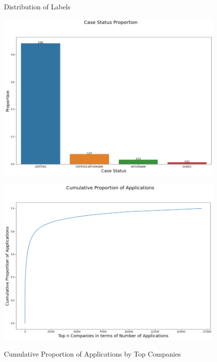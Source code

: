 \documentclass{article}
\begin{document}
\begin{figure}[h]
\centering
    \begin{minipage}{.32\textwidth}
        \centering
        \caption{Distribution of Labels}
        \includegraphics[width = \textwidth]{figures/fig11.png}
        \label{fig:labels_distribution}
    \end{minipage}
    \begin{minipage}{.32\textwidth}
        \centering
        \caption{Cumulative Proportion of Applications by Top Companies}
        \includegraphics[width = \textwidth]{figures/fig1.png}
        \label{fig:prevailing_wage}
    \end{minipage}
    \begin{minipage}{.33\textwidth}

\end{minipage}
\end{figure}
\end{document}
